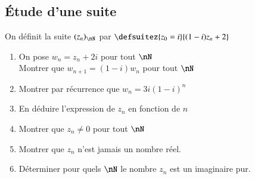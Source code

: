 \documentclass[oneside,12pt]{article}          %
\begin{document}
\subsection{Étude d'une suite}

On définit la suite $(z_n)_{\nN}$ par $\defsuitez{z_0=i}{(1-i)z_n+2}$
\begin{enumerate}
    \item On pose $w_n=z_n+2i$ pour tout $\nN$ \\
    Montrer que $w_{n+1}=(1-i)w_n$ pour tout $\nN$
    \item Montrer par récurrence que $w_n=3i(1-i)^n$
    \item En déduire l'expression de $z_n$ en fonction de $n$
    \item Montrer que $z_n\neq0$ pour tout $\nN$
    \item Montrer que $z_n$ n'est jamais un nombre réel.
    \item Déterminer pour quels $\nN$ le nombre $z_n$ est un imaginaire pur.
\end{enumerate}
\end{document}
